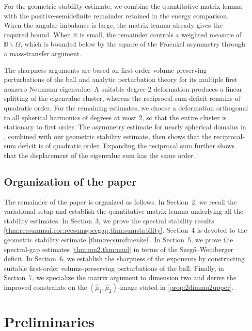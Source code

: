 \documentclass{amsart}
\numberwithin{equation}{section}
\theoremstyle{plain}
\theoremstyle{definition}
\theoremstyle{plain}
\theoremstyle{remark}
\numberwithin{figure}{section}
\newcommand{\B}{\mathbb{B}}
\newcommand{\muu}{\widehat{\mu}}
\begin{document}
For the geometric stability estimate, we combine the quantitative matrix lemma with the positive-semidefinite remainder retained in the energy comparison. When the angular imbalance is large, the matrix lemma already gives the required bound. When it is small, the remainder controls a weighted measure of $\B\backslash\Omega$, which is bounded below by the square of the Fraenkel asymmetry through a mass-transfer argument.

The sharpness arguments are based on first-order volume-preserving perturbations of the ball and analytic perturbation theory for its multiple first nonzero Neumann eigenvalue. A suitable degree-$2$ deformation produces a linear splitting of the eigenvalue cluster, whereas the reciprocal-sum deficit remains of quadratic order. For the remaining estimates, we choose a deformation orthogonal to all spherical harmonics of degrees at most $2$, so that the entire cluster is stationary to first order. The asymmetry estimate for nearly spherical domains in \cite[Lemma 6.2]{BDR12}, combined with our geometric stability estimate, then shows that the reciprocal-sum deficit is of quadratic order. Expanding the reciprocal sum further shows that the displacement of the eigenvalue sum has the same order.



\subsection{Organization of the paper}

The remainder of the paper is organized as follows. In Section~2, we recall the variational setup and establish the quantitative matrix lemma underlying all the stability estimates. In Section~3, we prove the spectral stability results \cref{thm:recsummui,cor:recsumspecgap,thm:sumstability}. Section~4 is devoted to the geometric stability estimate \cref{thm:recsumfraenkel}. In Section~5, we prove the spectral-gap estimates \cref{thm:mu2,thm:mud} in terms of the Szeg\H{o}--Weinberger deficit. In Section~6, we establish the sharpness of the exponents by constructing suitable first-order volume-preserving perturbations of the ball. Finally, in Section~7, we specialize the matrix argument to dimension two and derive the improved constraints on the $(\muu_1,\muu_2)$-image stated in \cref{prop:2dimmu2upper}.




\section{Preliminaries}
\end{document}
